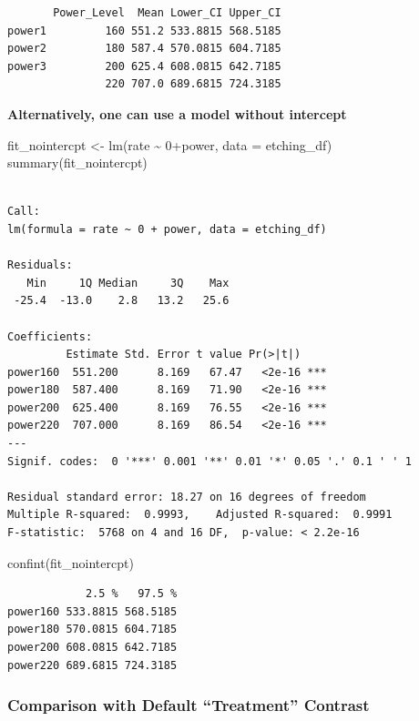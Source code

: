 \documentclass[
  letterpaper,
  DIV=11,
  numbers=noendperiod]{scrreprt}
\newenvironment{Shaded}{\begin{snugshade}}{\end{snugshade}}
\newcommand{\AttributeTok}[1]{\textcolor[rgb]{0.40,0.45,0.13}{#1}}
\newcommand{\DecValTok}[1]{\textcolor[rgb]{0.68,0.00,0.00}{#1}}
\newcommand{\FunctionTok}[1]{\textcolor[rgb]{0.28,0.35,0.67}{#1}}
\newcommand{\NormalTok}[1]{\textcolor[rgb]{0.00,0.23,0.31}{#1}}
\newcommand{\OtherTok}[1]{\textcolor[rgb]{0.00,0.23,0.31}{#1}}
\newcommand{\SpecialCharTok}[1]{\textcolor[rgb]{0.37,0.37,0.37}{#1}}
\begin{document}
\begin{verbatim}
       Power_Level  Mean Lower_CI Upper_CI
power1         160 551.2 533.8815 568.5185
power2         180 587.4 570.0815 604.7185
power3         200 625.4 608.0815 642.7185
               220 707.0 689.6815 724.3185
\end{verbatim}

\textbf{Alternatively, one can use a model without intercept}

\begin{Shaded}
\begin{Highlighting}[]
\NormalTok{fit\_nointercpt }\OtherTok{\textless{}{-}} \FunctionTok{lm}\NormalTok{(rate }\SpecialCharTok{\textasciitilde{}} \DecValTok{0}\SpecialCharTok{+}\NormalTok{power, }\AttributeTok{data =}\NormalTok{ etching\_df)}
\FunctionTok{summary}\NormalTok{(fit\_nointercpt)}
\end{Highlighting}
\end{Shaded}

\begin{verbatim}

Call:
lm(formula = rate ~ 0 + power, data = etching_df)

Residuals:
   Min     1Q Median     3Q    Max 
 -25.4  -13.0    2.8   13.2   25.6 

Coefficients:
         Estimate Std. Error t value Pr(>|t|)    
power160  551.200      8.169   67.47   <2e-16 ***
power180  587.400      8.169   71.90   <2e-16 ***
power200  625.400      8.169   76.55   <2e-16 ***
power220  707.000      8.169   86.54   <2e-16 ***
---
Signif. codes:  0 '***' 0.001 '**' 0.01 '*' 0.05 '.' 0.1 ' ' 1

Residual standard error: 18.27 on 16 degrees of freedom
Multiple R-squared:  0.9993,    Adjusted R-squared:  0.9991 
F-statistic:  5768 on 4 and 16 DF,  p-value: < 2.2e-16
\end{verbatim}

\begin{Shaded}
\begin{Highlighting}[]
\FunctionTok{confint}\NormalTok{(fit\_nointercpt)}
\end{Highlighting}
\end{Shaded}

\begin{verbatim}
            2.5 %   97.5 %
power160 533.8815 568.5185
power180 570.0815 604.7185
power200 608.0815 642.7185
power220 689.6815 724.3185
\end{verbatim}

\subsubsection{Comparison with Default ``Treatment''
Contrast}\label{comparison-with-default-treatment-contrast}
\end{document}
